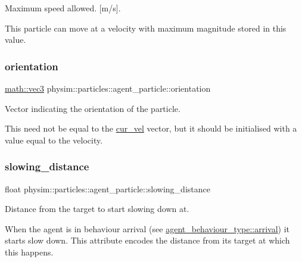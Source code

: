 Maximum speed allowed. \mbox{[}m/s\mbox{]}. 

This particle can move at a velocity with maximum magnitude stored in this value. \mbox{\label{classphysim_1_1particles_1_1agent__particle_a87b2554699454e6850f1d2b48e278f63}} 
\subsubsection{\texorpdfstring{orientation}{orientation}}
{\footnotesize\ttfamily \hyperlink{structphysim_1_1math_1_1vec3}{math\+::vec3} physim\+::particles\+::agent\+\_\+particle\+::orientation}



Vector indicating the orientation of the particle. 

This need not be equal to the \hyperlink{classphysim_1_1particles_1_1base__particle_a66a164d2a130c40901e3ec2709cdad43}{cur\+\_\+vel} vector, but it should be initialised with a value equal to the velocity. \mbox{\label{classphysim_1_1particles_1_1agent__particle_a1c3e4357a84047b45ea827a2e90cd14b}} 
\subsubsection{\texorpdfstring{slowing\+\_\+distance}{slowing\_distance}}
{\footnotesize\ttfamily float physim\+::particles\+::agent\+\_\+particle\+::slowing\+\_\+distance}



Distance from the target to start slowing down at. 

When the agent is in behaviour arrival (see \hyperlink{namespacephysim_1_1particles_a033757595f7862a0fc8a389d79bf9c88a0d4144ffc7e8e66a72800ea2b4101fd0}{agent\+\_\+behaviour\+\_\+type\+::arrival}) it starts slow down. This attribute encodes the distance from its target at which this happens. \mbox{\label{classphysim_1_1particles_1_1agent__particle_a0658207e11a5d39844856233ae8bf2cb}} 
